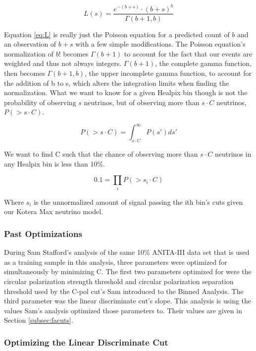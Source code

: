 \begin{equation} \label{eq:L}
L(s) = \frac{e^{-(b+s)} \cdot (b+s)^b}{\Gamma(b+1,b)}
\end{equation}

Equation \ref{eq:L} is really just the Poisson equation for a predicted count of $b$ and an observation of $b+s$ with a few simple modifications.  The Poisson equation's normalization of $b!$ becomes $\Gamma(b+1)$ to account for the fact that our events are weighted and thus not always integers.  $\Gamma(b+1)$, the complete gamma function, then becomes $\Gamma(b+1,b)$, the upper incomplete gamma function, to account for the addition of b to s, which alters the integration limits when finding the normalization.  
What we want to know for a given Healpix bin though is not the probability of observing $s$ neutrinos, but of observing more than $s \cdot C$ neutrinos, $P(>s \cdot C)$.

\begin{equation} \label{eq:PBin}
P(>s \cdot C) = \int_{s \cdot C}^{\infty} P(s')ds'
\end{equation}

We want to find C such that the chance of observing more than $s \cdot C$ neutrinos in any Healpix bin is less than 10\%. 

\begin{equation} \label{eq:HowC}
0.1    = \prod_i P(>s_i \cdot C) 
\end{equation}

Where $s_i$ is the unnormalized amount of signal passing the ith bin's cuts given our Kotera Max neutrino model.  

\subsubsection{Past Optimizations} \label{subsubsec:slopeOptimization}

During Sam Stafford's analysis of the same 10\% ANITA-III data set that is used as a training sample in this analysis, three parameters were optimized for simultaneously by minimizing C.  The first two parameters optimized for were the circular polarization strength threshold and circular polarization separation threshold used by the C-pol cut's Sam introduced to the Binned Analysis.  The third parameter was the linear discriminate cut's slope.  This analysis is using the values Sam's analysis optimized those parameters to.  Their values are given in Section \ref{subsec:facuts}.
 
\subsubsection{Optimizing the Linear Discriminate Cut} \label{subsubsec:optLDcut}

